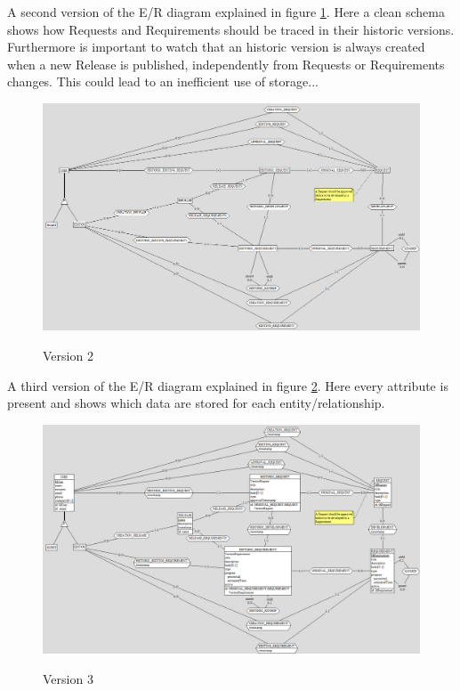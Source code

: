 \documentclass[12pt, a4paper]{report}
\begin{document}
A second version of the E/R diagram explained in figure \ref{fig:ER_v2}.
Here a clean schema shows how Requests and Requirements should be traced in their historic versions.
Furthermore is important to watch that an historic version is always created when a new Release is published, independently from
Requests or Requirements changes.
This could lead to an inefficient use of storage...

\begin{figure}[H]
\centering
\caption{Version 2}
\includegraphics[width=\textwidth]{E-R conceptual v2}
\label{fig:ER_v2}
\end{figure}

A third version of the E/R diagram explained in figure \ref{fig:ER_v3}.
Here every attribute is present and shows which data are stored for each entity/relationship.

\begin{figure}[H]
\centering
\caption{Version 3}
\includegraphics[width=\textwidth]{E-R conceptual v3}
\label{fig:ER_v3}
\end{figure}
\end{document}
